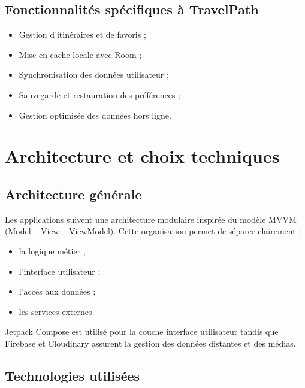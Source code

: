 \documentclass[a4paper, 12pt]{article}
\begin{document}
\begin{justify}
\subsection*{Fonctionnalités spécifiques à TravelPath}

\begin{itemize}
    \item Gestion d'itinéraires et de favoris ;
    \item Mise en cache locale avec Room ;
    \item Synchronisation des données utilisateur ;
    \item Sauvegarde et restauration des préférences ;
    \item Gestion optimisée des données hors ligne.
\end{itemize}

\section*{Architecture et choix techniques}

\subsection*{Architecture générale}

Les applications suivent une architecture modulaire inspirée du modèle MVVM (Model -- View -- ViewModel). Cette organisation permet de séparer clairement :
\begin{itemize}
    \item la logique métier ;
    \item l'interface utilisateur ;
    \item l'accès aux données ;
    \item les services externes.
\end{itemize}

Jetpack Compose est utilisé pour la couche interface utilisateur tandis que Firebase et Cloudinary assurent la gestion des données distantes et des médias.

\subsection*{Technologies utilisées}


\end{justify}
\end{document}
